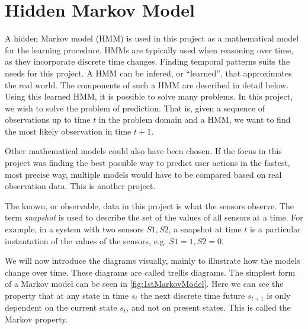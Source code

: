 \section{Hidden Markov Model}
A hidden Markov model (HMM) is used in this project as a mathematical model for the learning procedure. HMMs are typically used when reasoning over time, as they incorporate discrete time changes. Finding temporal patterns suits the needs for this project. A HMM can be infered, or \enquote{learned}, that approximates the real world. The components of such a HMM are described in detail below. Using this learned HMM, it is possible to solve many problems. In this project, we wish to solve the problem of prediction. That is, given a sequence of observations up to time $t$ in the problem domain and a HMM, we want to find the most likely observation in time $t+1$.

Other mathematical models could also have been chosen. If the focus in this project was finding the best possible way to predict user actions in the fastest, most precise way, multiple models would have to be compared based on real observation data. This is another project.

The known, or observable, data in this project is what the sensors observe. The term \emph{snapshot} is used to describe the set of the values of all sensors at a time. For example, in a system with two sensors $S1,S2$, a snapshot at time $t$ is a particular instantation of the values of the sensors, e.g. $S1=1, S2=0$.

We will now introduce the diagrams visually, mainly to illustrate how the models change over time. These diagrams are called trellis diagrams. The simplest form of a Markov model can be seen in \cref{fig:1stMarkovModel}. Here we can see the property that at any state in time $s_t$ the next discrete time future $s_{t+1}$ is only dependent on the current state $s_t$, and not on present states. This is called the Markov property. 

